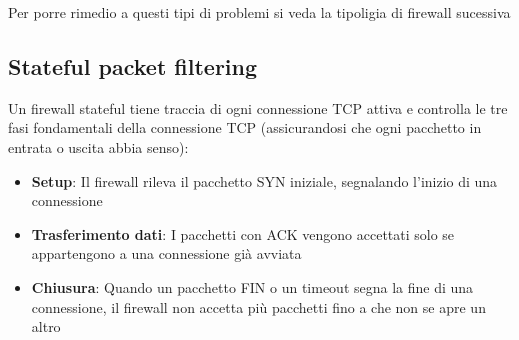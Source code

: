 Per porre rimedio a questi tipi di problemi si veda la tipoligia di firewall sucessiva

\subsection{Stateful packet filtering}
Un firewall stateful tiene traccia di ogni connessione TCP attiva e controlla le tre fasi fondamentali della connessione TCP (assicurandosi che ogni pacchetto in entrata o uscita abbia senso):
\begin{itemize}
    \item \textbf{Setup}: Il firewall rileva il pacchetto SYN iniziale, segnalando l'inizio di una connessione
    \item \textbf{Trasferimento dati}: I pacchetti con ACK vengono accettati solo se appartengono a una connessione già avviata
    \item \textbf{Chiusura}: Quando un pacchetto FIN o un timeout segna la fine di una connessione, il firewall non accetta più pacchetti fino a che non se apre un altro
\end{itemize}



